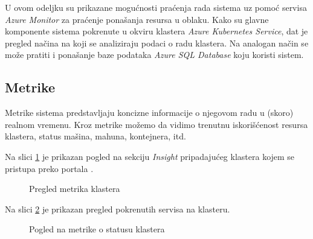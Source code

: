 \documentclass[12pt,oneside]{memoir}
\begin{document}
U ovom odeljku su prikazane mogućnosti praćenja rada sistema uz pomoć servisa \emph{Azure Monitor} za praćenje ponašanja resursa u oblaku. Kako su glavne komponente sistema pokrenute u okviru klastera \emph{Azure Kubernetes Service}, dat je pregled načina na koji se analiziraju podaci o radu klastera. Na analogan način se može pratiti i ponašanje baze podataka \emph{Azure SQL Database} koju koristi sistem.

\subsection{Metrike}

Metrike sistema predstavljaju koncizne informacije o njegovom radu u (skoro) realnom vremenu. Kroz metrike možemo da vidimo trenutnu iskorišćenost resursa klastera, status mašina, mahuna, kontejnera, itd.

Na slici \ref{fig:aksinsights} je prikazan pogled na sekciju \emph{Insight} pripadajućeg klastera kojem se pristupa preko portala \cite{AzurePortal}.

\begin{figure}[!ht]
  \centering
  \caption{Pregled metrika klastera}
  \label{fig:aksinsights}
\end{figure}

Na slici \ref{fig:clusterunhealthy} je prikazan pregled pokrenutih servisa na klasteru.

\begin{figure}[!ht]
  \centering
  \caption{Pogled na metrike o statusu klastera}
  \label{fig:clusterunhealthy}
\end{figure}
\end{document}
